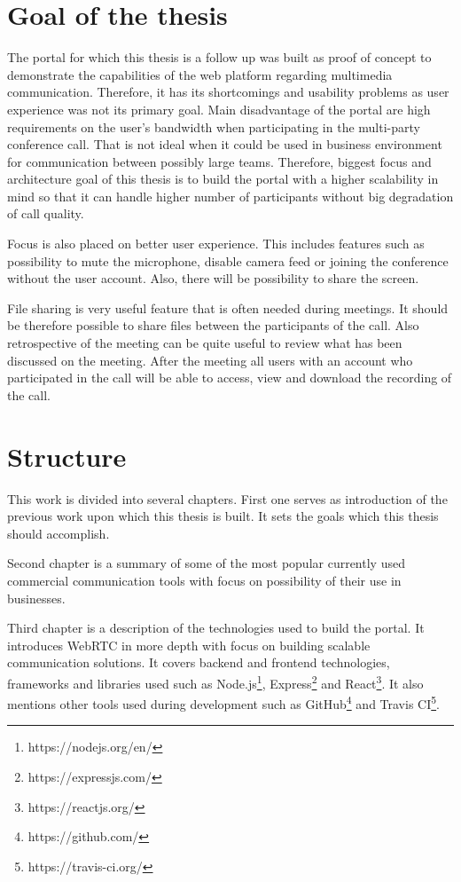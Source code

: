 \documentclass[
  digital, %
  table,   %
  lof,     %
  nolot,     %
]{fithesis3}
\begin{document}
\section{Goal of the thesis}
The portal for which this thesis is a follow up was built as proof of concept to demonstrate the capabilities of the web platform regarding multimedia communication. Therefore, it has its shortcomings and usability problems as user experience was not its primary goal. Main disadvantage of the portal are high requirements on the user's bandwidth when participating in the multi-party conference call. That is not ideal when it could be used in business environment for communication between possibly large teams. Therefore, biggest focus and architecture goal of this thesis is to build the portal with a higher scalability in mind so that it can handle higher number of participants without big degradation of call quality.

Focus is also placed on better user experience. This includes features such as possibility to mute the microphone, disable camera feed or joining  the conference without the user account. Also, there will be possibility to share the screen.
 
File sharing is very useful feature that is often needed during meetings. It should be therefore possible to share files between the participants of the call. Also retrospective of the meeting can be quite useful to review what has been discussed on the meeting. After the meeting all users with an account who participated in the call will be able to access, view and download the recording of the call.

\section{Structure}
This work is divided into several chapters. First one serves as introduction of the previous work upon which this thesis is built. It sets the goals which this thesis should accomplish.

Second chapter is a summary of some of the most popular currently used commercial communication tools with focus on possibility of their use in businesses.

Third chapter is a description of the technologies used to build the portal. It introduces WebRTC in more depth with focus on building scalable communication solutions. It covers backend and frontend technologies, frameworks and libraries used such as Node.js\footnote{https://nodejs.org/en/}, Express\footnote{https://expressjs.com/} and React\footnote{https://reactjs.org/}. It also mentions other tools used during development such as GitHub\footnote{https://github.com/} and Travis CI\footnote{https://travis-ci.org/}.
\end{document}
